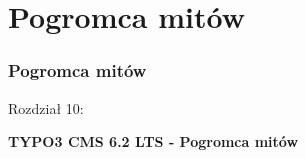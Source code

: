 %
\section{Pogromca mitów}
\begin{frame}[fragile]
	\frametitle{Pogromca mitów}

	\begin{center}\huge{Rozdział 10:}\end{center}
	\begin{center}\huge{\color{typo3darkgrey}\textbf{TYPO3 CMS 6.2 LTS - Pogromca mitów}}\end{center}

\end{frame}


